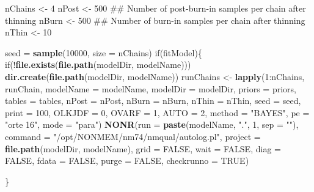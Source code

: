 \documentclass[]{article}
\newenvironment{Shaded}{\begin{snugshade}}{\end{snugshade}}
\newcommand{\KeywordTok}[1]{\textcolor[rgb]{0.13,0.29,0.53}{\textbf{{#1}}}}
\newcommand{\DataTypeTok}[1]{\textcolor[rgb]{0.13,0.29,0.53}{{#1}}}
\newcommand{\DecValTok}[1]{\textcolor[rgb]{0.00,0.00,0.81}{{#1}}}
\newcommand{\StringTok}[1]{\textcolor[rgb]{0.31,0.60,0.02}{{#1}}}
\newcommand{\OtherTok}[1]{\textcolor[rgb]{0.56,0.35,0.01}{{#1}}}
\newcommand{\NormalTok}[1]{{#1}}
\begin{document}
\begin{Shaded}
\begin{Highlighting}[]
\NormalTok{nChains <-}\StringTok{ }\DecValTok{4}
\NormalTok{nPost <-}\StringTok{ }\DecValTok{500} \NormalTok{## Number of post-burn-in samples per chain after thinning}
\NormalTok{nBurn <-}\StringTok{ }\DecValTok{500} \NormalTok{## Number of burn-in samples per chain after thinning}
\NormalTok{nThin <-}\StringTok{ }\DecValTok{10}

\NormalTok{seed =}\StringTok{ }\KeywordTok{sample}\NormalTok{(}\DecValTok{10000}\NormalTok{, }\DataTypeTok{size =} \NormalTok{nChains)}
\NormalTok{if(fitModel)\{}
  \NormalTok{if(!}\KeywordTok{file.exists}\NormalTok{(}\KeywordTok{file.path}\NormalTok{(modelDir, modelName))) }
    \KeywordTok{dir.create}\NormalTok{(}\KeywordTok{file.path}\NormalTok{(modelDir, modelName))}
  \NormalTok{runChains <-}\StringTok{ }\KeywordTok{lapply}\NormalTok{(}\DecValTok{1}\NormalTok{:nChains, runChain,}
                      \DataTypeTok{modelName =} \NormalTok{modelName, }\DataTypeTok{modelDir =} \NormalTok{modelDir, }
                      \DataTypeTok{priors =} \NormalTok{priors, }\DataTypeTok{tables =} \NormalTok{tables,}
                      \DataTypeTok{nPost =} \NormalTok{nPost, }\DataTypeTok{nBurn =} \NormalTok{nBurn, }\DataTypeTok{nThin =} \NormalTok{nThin, }
                      \DataTypeTok{seed =} \NormalTok{seed, }\DataTypeTok{print =} \DecValTok{100}\NormalTok{,}
                      \DataTypeTok{OLKJDF =} \DecValTok{0}\NormalTok{, }\DataTypeTok{OVARF =} \DecValTok{1}\NormalTok{, }\DataTypeTok{AUTO =} \DecValTok{2}\NormalTok{,}
                      \DataTypeTok{method =} \StringTok{"BAYES"}\NormalTok{, }\DataTypeTok{pe =} \StringTok{"orte 16"}\NormalTok{,}
                      \DataTypeTok{mode =} \StringTok{"para"}\NormalTok{)}
  \KeywordTok{NONR}\NormalTok{(}\DataTypeTok{run =} \KeywordTok{paste}\NormalTok{(modelName, }\StringTok{"."}\NormalTok{, }\DecValTok{1}\NormalTok{, }\DataTypeTok{sep =} \StringTok{""}\NormalTok{),}
         \DataTypeTok{command =} \StringTok{"/opt/NONMEM/nm74/nmqual/autolog.pl"}\NormalTok{,}
         \DataTypeTok{project =} \KeywordTok{file.path}\NormalTok{(modelDir, modelName),}
         \DataTypeTok{grid =} \OtherTok{FALSE}\NormalTok{,}
         \DataTypeTok{wait =} \OtherTok{FALSE}\NormalTok{,}
         \DataTypeTok{diag =} \OtherTok{FALSE}\NormalTok{,}
         \DataTypeTok{fdata =} \OtherTok{FALSE}\NormalTok{,}
         \DataTypeTok{purge =} \OtherTok{FALSE}\NormalTok{,}
         \DataTypeTok{checkrunno =} \OtherTok{TRUE}\NormalTok{)}
  
  \NormalTok{\}}
\end{Highlighting}
\end{Shaded}
\end{document}
